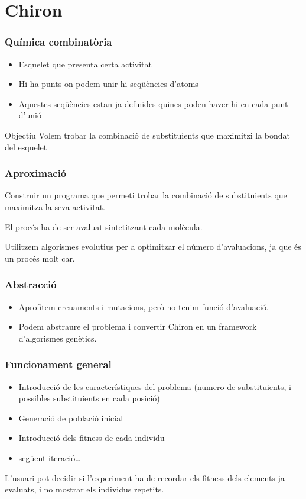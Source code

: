 \documentclass{beamer}
\begin{document}
\section{Chiron} %
\label{sec:Chiron}
\begin{frame}
	\frametitle{Química combinatòria}
	\begin{itemize}
		\item Esquelet que presenta certa activitat
		\item Hi ha punts on podem unir-hi seqüències d'atoms
		\item Aquestes seqüències estan ja definides quines poden haver-hi en cada punt d'unió
	\end{itemize}
	\pause
	\begin{block}{Objectiu}
		Volem trobar la combinació de substituients que maximitzi la bondat del esquelet
	\end{block}
\end{frame}

\begin{frame}
	\frametitle{Aproximació}
	Construir un programa que permeti trobar la combinació de substituients que
	maximitza la seva activitat.

	El procés ha de ser avaluat sintetitzant cada molècula.

	Utilitzem algorismes evolutius per a optimitzar el número d'avaluacions, ja
	que és un procés molt car.
\end{frame}

\begin{frame}
	\frametitle{Abstracció}
	\begin{itemize}
	\item Aprofitem creuaments i mutacions, però no tenim funció d'avaluació.
	\pause
	\item Podem abstraure el problema i convertir Chiron en un framework
	d'algorismes genètics.
	\end{itemize}
\end{frame}

\begin{frame}
\frametitle{Funcionament general}
\begin{itemize}
\item Introducció de les característiques del problema (numero de substituients,
i possibles substituients en cada posició)
\item Generació de població inicial
\item Introducció dels fitness de cada individu
\item següent iteració\ldots
\end{itemize}
\pause
L'usuari pot decidir si l'experiment ha de recordar els fitness dels elements ja
evaluats, i no mostrar els individus repetits.
\end{frame}
\end{document}
